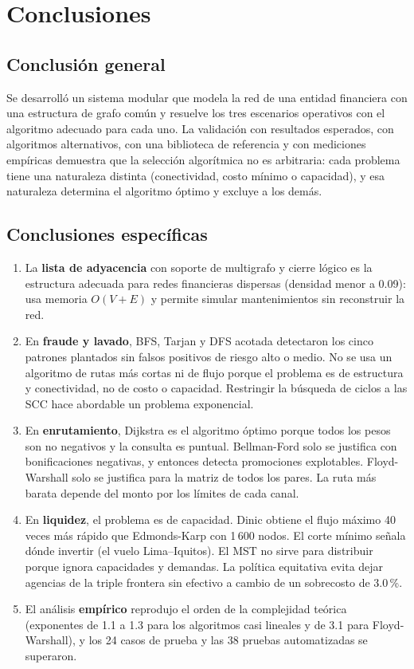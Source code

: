 \documentclass[11pt,a4paper]{article}
\begin{document}
\section{Conclusiones}
\subsection{Conclusión general}
Se desarrolló un sistema modular que modela la red de una entidad financiera con una estructura de grafo común y
resuelve los tres escenarios operativos con el algoritmo adecuado para cada uno. La validación con resultados
esperados, con algoritmos alternativos, con una biblioteca de referencia y con mediciones empíricas demuestra que la
selección algorítmica no es arbitraria: cada problema tiene una naturaleza distinta (conectividad, costo mínimo o
capacidad), y esa naturaleza determina el algoritmo óptimo y excluye a los demás.

\subsection{Conclusiones específicas}
\begin{enumerate}[label=CE\arabic*.,leftmargin=3.2em]
  \item La \textbf{lista de adyacencia} con soporte de multigrafo y cierre lógico es la estructura adecuada para redes
        financieras dispersas (densidad menor a 0.09): usa memoria $O(V+E)$ y permite simular mantenimientos sin
        reconstruir la red.
  \item En \textbf{fraude y lavado}, BFS, Tarjan y DFS acotada detectaron los cinco patrones plantados sin falsos
        positivos de riesgo alto o medio. No se usa un algoritmo de rutas más cortas ni de flujo porque el problema es
        de estructura y conectividad, no de costo o capacidad. Restringir la búsqueda de ciclos a las SCC hace
        abordable un problema exponencial.
  \item En \textbf{enrutamiento}, Dijkstra es el algoritmo óptimo porque todos los pesos son no negativos y la
        consulta es puntual. Bellman-Ford solo se justifica con bonificaciones negativas, y entonces detecta
        promociones explotables. Floyd-Warshall solo se justifica para la matriz de todos los pares. La ruta más
        barata depende del monto por los límites de cada canal.
  \item En \textbf{liquidez}, el problema es de capacidad. Dinic obtiene el flujo máximo 40 veces más rápido que
        Edmonds-Karp con 1\,600 nodos. El corte mínimo señala dónde invertir (el vuelo Lima–Iquitos). El MST no sirve
        para distribuir porque ignora capacidades y demandas. La política equitativa evita dejar agencias de la
        triple frontera sin efectivo a cambio de un sobrecosto de 3.0\,\%.
  \item El análisis \textbf{empírico} reprodujo el orden de la complejidad teórica (exponentes de 1.1 a 1.3 para los
        algoritmos casi lineales y de 3.1 para Floyd-Warshall), y los 24 casos de prueba y las 38 pruebas
        automatizadas se superaron.
\end{enumerate}
\end{document}

